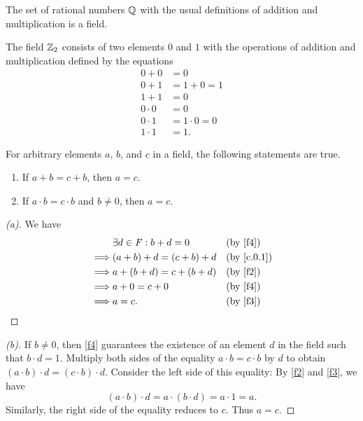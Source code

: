 \begin{eg}\label{c.0.3}
  The set of rational numbers \(\mathbb{Q}\) with the usual definitions of addition and multiplication is a field.
\end{eg}

\begin{eg}\label{c.0.4}
  The field \(\mathbb{Z}_2\) consists of two elements \(0\) and \(1\) with the operations of addition and multiplication defined by the equations
  \begin{align*}
    0 + 0     & = 0             \\
    0 + 1     & = 1 + 0 = 1     \\
    1 + 1     & = 0             \\
    0 \cdot 0 & = 0             \\
    0 \cdot 1 & = 1 \cdot 0 = 0 \\
    1 \cdot 1 & = 1.
  \end{align*}
\end{eg}

\begin{thm}\label{c.1}
  For arbitrary elements \(a\), \(b\), and \(c\) in a field, the following statements are true.
  \begin{enumerate}
    \item If \(a + b = c + b\), then \(a = c\).
    \item If \(a \cdot b = c \cdot b\) and \(b \neq 0\), then \(a = c\).
  \end{enumerate}
\end{thm}

\begin{proof}[(a)]
  We have
  \begin{align*}
             & \exists d \in \F : b + d = 0 &  & \text{(by \ref{f4})} \\
    \implies & (a + b) + d = (c + b) + d    &  & \by{c.0.1}           \\
    \implies & a + (b + d) = c + (b + d)    &  & \text{(by \ref{f2})} \\
    \implies & a + 0 = c + 0                &  & \text{(by \ref{f4})} \\
    \implies & a = c.                       &  & \text{(by \ref{f3})}
  \end{align*}
\end{proof}

\begin{proof}[(b)]
  If \(b \neq 0\), then \ref{f4} guarantees the existence of an element \(d\) in the field such that \(b \cdot d = 1\).
  Multiply both sides of the equality \(a \cdot b = c \cdot b\) by \(d\) to obtain \((a \cdot b) \cdot d = (c \cdot b) \cdot d\).
  Consider the left side of this equality:
  By \ref{f2} and \ref{f3}, we have
  \[
    (a \cdot b) \cdot d = a \cdot (b \cdot d) = a \cdot 1 = a.
  \]
  Similarly, the right side of the equality reduces to \(c\).
  Thus \(a = c\).
\end{proof}

